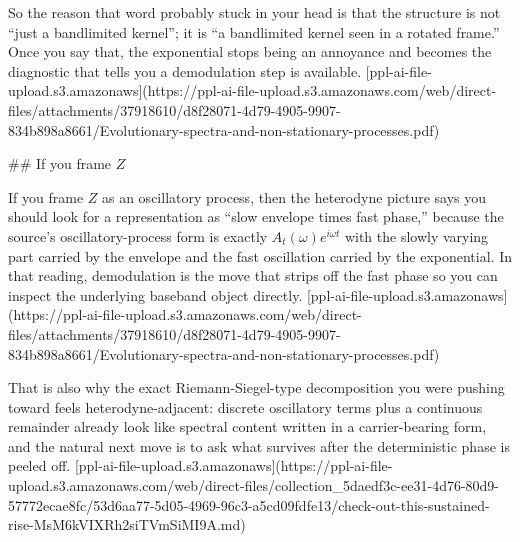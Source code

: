 So the reason that word probably stuck in your head is that the structure is not “just a bandlimited kernel”; it is “a bandlimited kernel seen in a rotated frame.” Once you say that, the exponential stops being an annoyance and becomes the diagnostic that tells you a demodulation step is available. [ppl-ai-file-upload.s3.amazonaws](https://ppl-ai-file-upload.s3.amazonaws.com/web/direct-files/attachments/37918610/d8f28071-4d79-4905-9907-834b898a8661/Evolutionary-spectra-and-non-stationary-processes.pdf)

## If you frame \(Z\)

If you frame \(Z\) as an oscillatory process, then the heterodyne picture says you should look for a representation as “slow envelope times fast phase,” because the source’s oscillatory-process form is exactly \(A_t(\omega)e^{i\omega t}\) with the slowly varying part carried by the envelope and the fast oscillation carried by the exponential. In that reading, demodulation is the move that strips off the fast phase so you can inspect the underlying baseband object directly. [ppl-ai-file-upload.s3.amazonaws](https://ppl-ai-file-upload.s3.amazonaws.com/web/direct-files/attachments/37918610/d8f28071-4d79-4905-9907-834b898a8661/Evolutionary-spectra-and-non-stationary-processes.pdf)

That is also why the exact Riemann-Siegel-type decomposition you were pushing toward feels heterodyne-adjacent: discrete oscillatory terms plus a continuous remainder already look like spectral content written in a carrier-bearing form, and the natural next move is to ask what survives after the deterministic phase is peeled off. [ppl-ai-file-upload.s3.amazonaws](https://ppl-ai-file-upload.s3.amazonaws.com/web/direct-files/collection_5daedf3c-ee31-4d76-80d9-57772ecae8fc/53d6aa77-5d05-4969-96c3-a5cd09fdfe13/check-out-this-sustained-rise-MsM6kVIXRh2siTVmSiMI9A.md)

